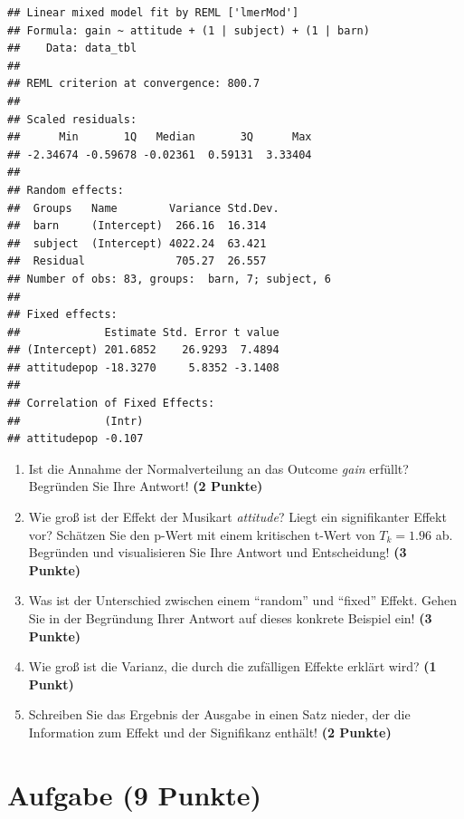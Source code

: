 \documentclass[a4paper, 10pt]{scrartcl}\usepackage[]{graphicx}\usepackage[]{color}
\makeatletter
\newenvironment{kframe}{%
 \def\at@end@of@kframe{}%
 \ifinner\ifhmode%
  \def\at@end@of@kframe{\end{minipage}}%
  \begin{minipage}{\columnwidth}%
 \fi\fi%
 \def\FrameCommand##1{\hskip\@totalleftmargin \hskip-\fboxsep
 \colorbox{shadecolor}{##1}\hskip-\fboxsep
     \hskip-\linewidth \hskip-\@totalleftmargin \hskip\columnwidth}%
 \MakeFramed {\advance\hsize-\width
   \@totalleftmargin\z@ \linewidth\hsize
   \@setminipage}}%
 {\par\unskip\endMakeFramed%
 \at@end@of@kframe}
\newenvironment{knitrout}{}{} %
\makeatother
\begin{document}
\begin{knitrout}
\color{fgcolor}\begin{kframe}
\begin{verbatim}
## Linear mixed model fit by REML ['lmerMod']
## Formula: gain ~ attitude + (1 | subject) + (1 | barn)
##    Data: data_tbl
## 
## REML criterion at convergence: 800.7
## 
## Scaled residuals: 
##      Min       1Q   Median       3Q      Max 
## -2.34674 -0.59678 -0.02361  0.59131  3.33404 
## 
## Random effects:
##  Groups   Name        Variance Std.Dev.
##  barn     (Intercept)  266.16  16.314  
##  subject  (Intercept) 4022.24  63.421  
##  Residual              705.27  26.557  
## Number of obs: 83, groups:  barn, 7; subject, 6
## 
## Fixed effects:
##             Estimate Std. Error t value
## (Intercept) 201.6852    26.9293  7.4894
## attitudepop -18.3270     5.8352 -3.1408
## 
## Correlation of Fixed Effects:
##             (Intr)
## attitudepop -0.107
\end{verbatim}
\end{kframe}
\end{knitrout}


\begin{enumerate}
\item Ist die Annahme der Normalverteilung an das Outcome \textit{gain} erf{\"u}llt?
  Begr{\"u}nden Sie Ihre Antwort! \textbf{(2 Punkte)}
\item Wie gro{\ss} ist der Effekt der Musikart \textit{attitude}? Liegt ein signifikanter
  Effekt vor? Sch{\"a}tzen Sie den p-Wert mit einem kritischen t-Wert von $T_k
  = 1.96$ ab. Begr{\"u}nden und visualisieren Sie Ihre Antwort und
  Entscheidung! \textbf{(3 Punkte)}
\item Was ist der Unterschied zwischen einem "`random"' und "`fixed"'
  Effekt. Gehen Sie in der Begr{\"u}ndung Ihrer Antwort auf dieses konkrete
  Beispiel ein! \textbf{(3 Punkte)}
\item Wie gro{\ss} ist die Varianz, die durch die zuf{\"a}lligen Effekte erkl{\"a}rt wird? \textbf{(1 Punkt)}
\item Schreiben Sie das Ergebnis der \Rlogo Ausgabe in einen Satz nieder, der die
  Information zum Effekt und der Signifikanz enth{\"a}lt! \textbf{(2 Punkte)}
\end{enumerate}
 
\clearpage

\section{Aufgabe \hfill (9 Punkte)}
\end{document}
